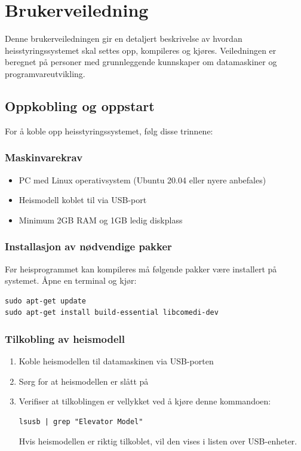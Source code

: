 \chapter{Brukerveiledning}
Denne brukerveiledningen gir en detaljert beskrivelse av hvordan heisstyringssystemet skal settes opp, kompileres og kjøres. Veiledningen er beregnet på personer med grunnleggende kunnskaper om datamaskiner og programvareutvikling.

\section{Oppkobling og oppstart}
For å koble opp heisstyringssystemet, følg disse trinnene:

\subsection{Maskinvarekrav}
\begin{itemize}
    \item PC med Linux operativsystem (Ubuntu 20.04 eller nyere anbefales)
    \item Heismodell koblet til via USB-port
    \item Minimum 2GB RAM og 1GB ledig diskplass
\end{itemize}

\subsection{Installasjon av nødvendige pakker}
Før heisprogrammet kan kompileres må følgende pakker være installert på systemet. Åpne en terminal og kjør:

\begin{lstlisting}[style=cpp, caption=Installasjon av nødvendige pakker]
sudo apt-get update
sudo apt-get install build-essential libcomedi-dev
\end{lstlisting}

\subsection{Tilkobling av heismodell}
\begin{enumerate}
    \item Koble heismodellen til datamaskinen via USB-porten
    \item Sørg for at heismodellen er slått på
    \item Verifiser at tilkoblingen er vellykket ved å kjøre denne kommandoen:
    \begin{lstlisting}[style=cpp]
    lsusb | grep "Elevator Model"
    \end{lstlisting}
    Hvis heismodellen er riktig tilkoblet, vil den vises i listen over USB-enheter.
\end{enumerate}

